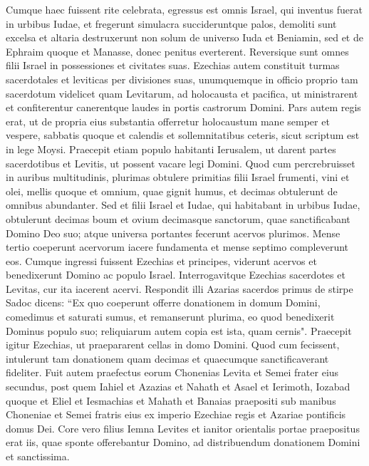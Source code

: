 \begin{biblechapter}  
\verse Cumque haec fuissent rite celebrata, egressus est omnis Israel, qui inventus fuerat in urbibus Iudae, et fregerunt simulacra succideruntque palos, demoliti sunt excelsa et altaria destruxerunt non solum de universo Iuda et Beniamin, sed et de Ephraim quoque et Manasse, donec penitus everterent. Reversique sunt omnes filii Israel in possessiones et civitates suas. 
\verse Ezechias autem constituit turmas sacerdotales et leviticas per divisiones suas, unumquemque in officio proprio tam sacerdotum videlicet quam Levitarum, ad holocausta et pacifica, ut ministrarent et confiterentur canerentque laudes in portis castrorum Domini. 
\verse Pars autem regis erat, ut de propria eius substantia offerretur holocaustum mane semper et vespere, sabbatis quoque et calendis et sollemnitatibus ceteris, sicut scriptum est in lege Moysi. 
\verse Praecepit etiam populo habitanti Ierusalem, ut darent partes sacerdotibus et Levitis, ut possent vacare legi Domini. 
\verse Quod cum percrebruisset in auribus multitudinis, plurimas obtulere primitias filii Israel frumenti, vini et olei, mellis quoque et omnium, quae gignit humus, et decimas obtulerunt de omnibus abundanter. 
\verse Sed et filii Israel et Iudae, qui habitabant in urbibus Iudae, obtulerunt decimas boum et ovium decimasque sanctorum, quae sanctificabant Domino Deo suo; atque universa portantes fecerunt acervos plurimos. 
\verse Mense tertio coeperunt acervorum iacere fundamenta et mense septimo compleverunt eos. 
\verse Cumque ingressi fuissent Ezechias et principes, viderunt acervos et benedixerunt Domino ac populo Israel. 
\verse Interrogavitque Ezechias sacerdotes et Levitas, cur ita iacerent acervi. 
\verse Respondit illi Azarias sacerdos primus de stirpe Sadoc dicens: “Ex quo coeperunt offerre donationem in domum Domini, comedimus et saturati sumus, et remanserunt plurima, eo quod benedixerit Dominus populo suo; reliquiarum autem copia est ista, quam cernis". 
\verse Praecepit igitur Ezechias, ut praepararent cellas in domo Domini. Quod cum fecissent, 
\verse intulerunt tam donationem quam decimas et quaecumque sanctificaverant fideliter. Fuit autem praefectus eorum Chonenias Levita et Semei frater eius secundus, 
\verse post quem Iahiel et Azazias et Nahath et Asael et Ierimoth, Iozabad quoque et Eliel et Iesmachias et Mahath et Banaias praepositi sub manibus Choneniae et Semei fratris eius ex imperio Ezechiae regis et Azariae pontificis domus Dei. 
\verse Core vero filius Iemna Levites et ianitor orientalis portae praepositus erat iis, quae sponte offerebantur Domino, ad distribuendum donationem Domini et sanctissima. 

\end{biblechapter}
